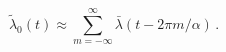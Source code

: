 \begin{equation}
\tilde\lambda_0(t)\approx \sum_{m=-\infty}^{\infty}
\bar\lambda(t-2\pi m/\alpha) \,.
\end{equation}

